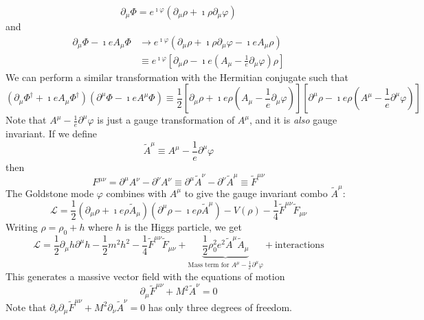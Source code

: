 \documentclass[a4paper,twoside,master.tex]{subfiles}
\begin{document}
\begin{equation}
    \partial_{\mu} \Phi = e^{\imath \varphi} (\partial_{\mu} \rho + \imath \rho \partial_{\mu} \varphi)
\end{equation}
and
\begin{align}
    \partial_{\mu} \Phi - \imath e A_{\mu} \Phi &\to e^{\imath \varphi}(\partial_{\mu} \rho + \imath \rho \partial_{\mu} \varphi - \imath e A_{\mu} \rho) \\
                                                &\equiv e^{\imath \varphi} \left[ \partial_{\mu} \rho - \imath e \left( A_{\mu} - \frac{1}{e} \partial_{\mu} \varphi \right) \rho \right]
\end{align}
We can perform a similar transformation with the Hermitian conjugate such that
\begin{equation}
    (\partial_{\mu} \Phi^\dagger + \imath e A_{\mu} \Phi^\dagger)(\partial^{\mu} \Phi - \imath e A^{\mu} \Phi) \equiv \frac{1}{2} \left[ \partial_{\mu} \rho + \imath e \rho \left( A_{\mu} - \frac{1}{e} \partial_{\mu} \varphi \right) \right]\left[ \partial^{\mu} \rho - \imath e \rho \left( A^{\mu} - \frac{1}{e} \partial^{\mu} \varphi \right) \right]
\end{equation}
Note that $ A^{\mu} - \frac{1}{e} \partial^{\mu} \varphi $ is just a gauge transformation of $ A^{\mu} $, and it is \textit{also} gauge invariant. If we define
\begin{equation}
    \tilde{A}^{\mu} \equiv A^{\mu} - \frac{1}{e} \partial^{\mu} \varphi
\end{equation}
then
\begin{equation}
    F^{\mu \nu} = \partial^{\mu} A^{\nu} - \partial^{\nu} A^{\nu} \equiv \partial^{\mu} \tilde{A}^{\nu} - \partial^{\nu} \tilde{A}^{\mu} \equiv \tilde{F}^{\mu \nu}
\end{equation}
The Goldstone mode $ \varphi $ combines with $ A^{\mu} $ to give the gauge invariant combo $ \tilde{A}^{\mu} $:
\begin{equation}
    \mathcal{L} = \frac{1}{2} \left( \partial_{\mu} \rho + \imath e \rho \tilde{A}_{\mu} \right)\left( \partial^{\mu} \rho - \imath e \rho \tilde{A}^{\mu} \right) - V(\rho) - \frac{1}{4} \tilde{F}^{\mu \nu} \tilde{F}_{\mu \nu}
\end{equation}
Writing $ \rho = \rho_0 + h $ where $ h $ is the Higgs particle, we get
\begin{equation}
    \mathcal{L} = \frac{1}{2} \partial_{\mu} h \partial^{\mu} h - \frac{1}{2} m^2 h^2 - \frac{1}{4} \tilde{F}^{\mu \nu} \tilde{F}_{\mu \nu} + \underbrace{\frac{1}{2} \rho_0^2 e^2 \tilde{A}^{\mu} \tilde{A}_{\mu}}_{\text{Mass term for } A^{\mu} - \frac{1}{e} \partial^{\mu} \varphi} + \text{interactions}
\end{equation}
This generates a massive vector field with the equations of motion
\begin{equation}
    \partial_{\mu} \tilde{F}^{\mu \nu} + M^2 \tilde{A}^{\nu} = 0
\end{equation}
Note that $ \partial_{\nu} \partial_{\mu} \tilde{F}^{\mu \nu} + M^2 \partial_{\nu} \tilde{A}^{\nu} = 0 $ has only three degrees of freedom.
\end{document}
